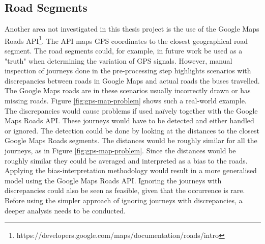 \subsection{Road Segments}
Another area not investigated in this thesis project is the use of the Google Maps Roads API\footnote{https://developers.google.com/maps/documentation/roads/intro}.
The API maps GPS coordinates to the closest geographical road segment.
The road segments could, for example, in future work be used as a "truth" when determining the variation of GPS signals.
However, manual inspection of journeys done in the pre-processing step highlights scenarios with discrepancies between roads in Google Maps and actual roads the buses travelled.
The Google Maps roads are in these scenarios usually incorrectly drawn or has missing roads.
Figure \ref{fig:gps-map-problem} shows such a real-world example.
The discrepancies would cause problems if used naïvely together with the Google Maps Roads API.
These journeys would have to be detected and either handled or ignored.
The detection could be done by looking at the distances to the closest Google Maps Roads segments.
The distances would be roughly similar for all the journeys, as in Figure \ref{fig:gps-map-problem}.
Since the distances would be roughly similar they could be averaged and interpreted as a bias to the roads.
Applying the bias-interpretation methodology would result in a more generalised model using the Google Maps Roads API.
Ignoring the journeys with discrepancies could also be seen as feasible, given that the occurrence is rare.
Before using the simpler approach of ignoring journeys with discrepancies, a deeper analysis needs to be conducted.
